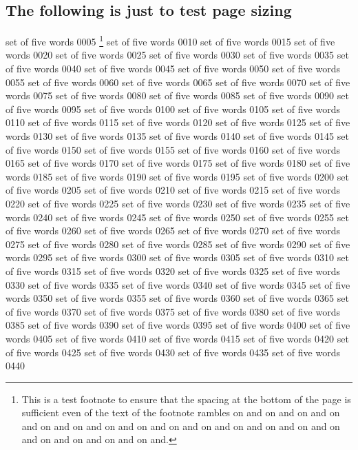 \clearpage

\subsection{The following is just to test page sizing}

\clearpage
set	of	five	words	0005
\footnote{This is a test footnote to ensure that the spacing at the
bottom of the page is sufficient even of the text of the footnote
rambles
on and on and
on and on and
on and on and
on and on and
on and on and
on and on and
on and on and
on and on and
on and on and.}
set	of	five	words	0010
set	of	five	words	0015
set	of	five	words	0020
set	of	five	words	0025
set	of	five	words	0030
set	of	five	words	0035
set	of	five	words	0040
set	of	five	words	0045
set	of	five	words	0050
set	of	five	words	0055
set	of	five	words	0060
set	of	five	words	0065
set	of	five	words	0070
set	of	five	words	0075
set	of	five	words	0080
set	of	five	words	0085
set	of	five	words	0090
set	of	five	words	0095
set	of	five	words	0100
set	of	five	words	0105
set	of	five	words	0110
set	of	five	words	0115
set	of	five	words	0120
set	of	five	words	0125
set	of	five	words	0130
set	of	five	words	0135
set	of	five	words	0140
set	of	five	words	0145
set	of	five	words	0150
set	of	five	words	0155
set	of	five	words	0160
set	of	five	words	0165
set	of	five	words	0170
set	of	five	words	0175
set	of	five	words	0180
set	of	five	words	0185
set	of	five	words	0190
set	of	five	words	0195
set	of	five	words	0200
set	of	five	words	0205
set	of	five	words	0210
set	of	five	words	0215
set	of	five	words	0220
set	of	five	words	0225
set	of	five	words	0230
set	of	five	words	0235
set	of	five	words	0240
set	of	five	words	0245
set	of	five	words	0250
set	of	five	words	0255
set	of	five	words	0260
set	of	five	words	0265
set	of	five	words	0270
set	of	five	words	0275
set	of	five	words	0280
set	of	five	words	0285
set	of	five	words	0290
set	of	five	words	0295
set	of	five	words	0300
set	of	five	words	0305
set	of	five	words	0310
set	of	five	words	0315
set	of	five	words	0320
set	of	five	words	0325
set	of	five	words	0330
set	of	five	words	0335
set	of	five	words	0340
set	of	five	words	0345
set	of	five	words	0350
set	of	five	words	0355
set	of	five	words	0360
set	of	five	words	0365
set	of	five	words	0370
set	of	five	words	0375
set	of	five	words	0380
set	of	five	words	0385
set	of	five	words	0390
set	of	five	words	0395
set	of	five	words	0400
set	of	five	words	0405
set	of	five	words	0410
set	of	five	words	0415
set	of	five	words	0420
set	of	five	words	0425
set	of	five	words	0430
set	of	five	words	0435
set	of	five	words	0440
